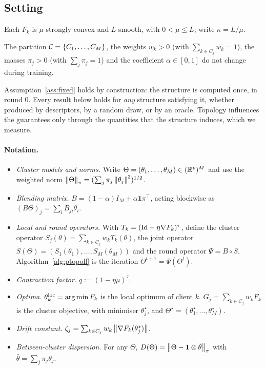 \subsection{Setting}
\begin{assumption}\label{ass:sc}
Each $F_k$ is $\mu$-strongly convex and $L$-smooth, with $0<\mu\le L$; write $\kappa=L/\mu$.
\end{assumption}
\begin{assumption}\label{ass:fixed}
The partition $\mathcal{C}=\{C_1,\dots,C_M\}$, the weights $w_k>0$ (with $\sum_{k\in C_j}w_k=1$),
the masses $\pi_j>0$ (with $\sum_j\pi_j=1$) and the coefficient $\alpha\in[0,1]$ do not
change during training.
\end{assumption}
Assumption~\ref{ass:fixed} holds by construction: the structure is computed once, in round
$0$. Every result below holds for \emph{any} structure satisfying it, whether produced by
descriptors, by a random draw, or by an oracle. Topology influences the guarantees only
through the quantities that the structure induces, which we measure.

\paragraph{Notation.}
\begin{itemize}[leftmargin=1.2em,itemsep=2pt]
  \item \emph{Cluster models and norms.} Write $\Theta=(\theta_1,\dots,\theta_M)\in(\mathbb{R}^p)^M$
    and use the weighted norm $\left\lVert \Theta \right\rVert_{\pi}=(\sum_j\pi_j\left\lVert \theta_j \right\rVert^2)^{1/2}$.
  \item \emph{Blending matrix.} $B=(1-\alpha)I_M+\alpha\mathbf{1}\pi^\top$, acting
    blockwise as $(B\Theta)_j=\sum_iB_{ji}\theta_i$.
  \item \emph{Local and round operators.} With $T_k=(\mathrm{Id}-\eta\nabla F_k)^{\tau}$, define
    the cluster operator $S_j(\theta)=\sum_{k\in C_j}w_kT_k(\theta)$, the joint operator
    $S(\Theta)=(S_1(\theta_1),\dots,S_M(\theta_M))$ and the round operator $\Psi=B\circ S$.
    Algorithm~\ref{alg:ptopofl} is the iteration $\Theta^{t+1}=\Psi(\Theta^t)$.
  \item \emph{Contraction factor.} $q:=(1-\eta\mu)^{\tau}$.
  \item \emph{Optima.} $\theta_k^{\mathrm{loc}}=\operatorname*{arg\,min} F_k$ is the local optimum of client $k$.
    $G_j=\sum_{k\in C_j}w_kF_k$ is the cluster objective, with minimiser $\theta_j^\star$,
    and $\Theta^\star=(\theta_1^\star,\dots,\theta_M^\star)$.
  \item \emph{Drift constant.} $\zeta_j=\sum_{k\in C_j}w_k\left\lVert \nabla F_k(\theta_j^\star) \right\rVert$.
  \item \emph{Between-cluster dispersion.} For any $\Theta$,
    $D(\Theta)=\left\lVert \Theta-\mathbf{1}\otimes\bar\theta \right\rVert_{\pi}$ with
    $\bar\theta=\sum_j\pi_j\theta_j$.
\end{itemize}

